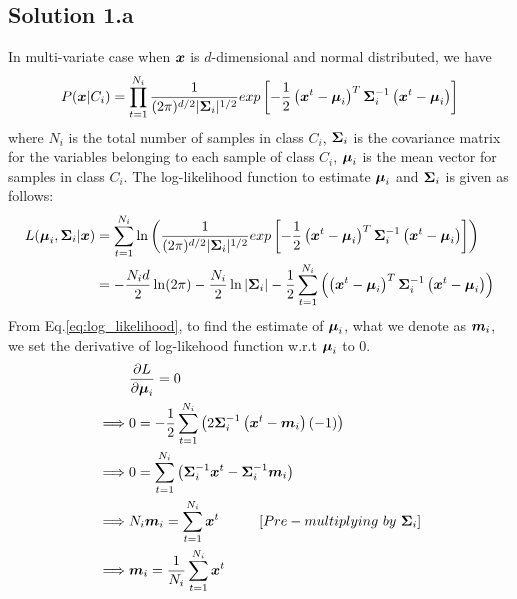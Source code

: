 \subsection*{Solution 1.a}
In multi-variate case when $\boldsymbol{x}$ is $d$-dimensional and normal distributed, we have
\begin{equation*}
	P(\boldsymbol{x}|C_i) = \prod_{t=1}^{N_i} \frac{1}{(2\pi)^{d/2}|\boldsymbol{\Sigma}_i|^{1/2}} exp\left[-\frac{1}{2} \left(\boldsymbol{x}^t-\boldsymbol{\mu}_i\right)^T\boldsymbol{\Sigma}_i^{-1}\left(\boldsymbol{x}^t - \boldsymbol{\mu}_i\right)\right]
\end{equation*}
where $N_i$ is the total number of samples in class $C_i$, $\boldsymbol{\Sigma}_i$ is the covariance matrix for the variables belonging to each sample of class $C_i$, $\boldsymbol{\mu}_i$ is the mean vector for samples in class $C_i$.
\newline
The log-likelihood function to estimate $\boldsymbol{\mu}_i$ and $\boldsymbol{\Sigma}_i$ is given as follows:
\begin{equation}\label{eq:log_likelihood}
	\begin{split}
		L(\boldsymbol{\mu}_i, \boldsymbol{\Sigma}_i|\boldsymbol{x}) &= \sum_{t=1}^{N_i} \ln \left(\frac{1}{(2\pi)^{d/2}|\boldsymbol{\Sigma}_i|^{1/2}} exp\left[-\frac{1}{2} \left(\boldsymbol{x}^t-\boldsymbol{\mu}_i\right)^T\boldsymbol{\Sigma}_i^{-1}\left(\boldsymbol{x}^t - \boldsymbol{\mu}_i\right)\right]\right)\\
		&= -\frac{N_id}{2}\ln(2\pi) - \frac{N_i}{2}\ln|\boldsymbol{\Sigma}_i| -\frac{1}{2}\sum_{t=1}^{N_i}\left(\left(\boldsymbol{x}^t-\boldsymbol{\mu}_i\right)^T\boldsymbol{\Sigma}_i^{-1}\left(\boldsymbol{x}^t - \boldsymbol{\mu}_i\right)\right)
	\end{split}
\end{equation}
From Eq.\ref{eq:log_likelihood}, to find the estimate of $\boldsymbol{\mu}_i$, what we denote as $\boldsymbol{m}_i$, we set the derivative of log-likehood function w.r.t $\boldsymbol{\mu}_i$ to 0.
\begin{equation}\label{eq:mle_mean}
	\begin{split}
		& \frac{\partial L}{\partial \boldsymbol{\mu}_i} = 0\\
		\implies & 0 = -\frac{1}{2}\sum_{t=1}^{N_i}\left(2\boldsymbol{\Sigma}_i^{-1}\left(\boldsymbol{x}^t-\boldsymbol{m}_i\right)(-1)\right)\\
		\implies & 0 = \sum_{t=1}^{N_i}\left(\boldsymbol{\Sigma}_i^{-1}\boldsymbol{x}^t - \boldsymbol{\Sigma}_i^{-1}\boldsymbol{m}_i\right)\\
		\implies & N_i\boldsymbol{m}_i = \sum_{t=1}^{N_i}\boldsymbol{x}^t \hspace*{1cm}[Pre-multiplying\ by\ \boldsymbol{\Sigma}_i]\\
		\implies & \boldsymbol{m}_i = \frac{1}{N_i}\sum_{t=1}^{N_i}\boldsymbol{x}^t\\
	\end{split}
\end{equation}
